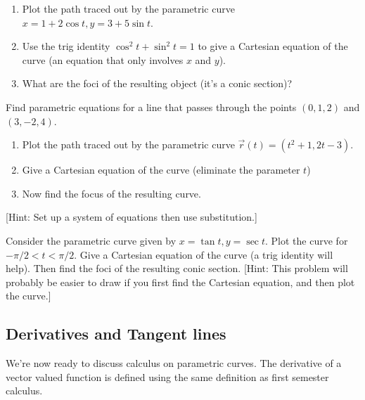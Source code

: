 \begin{problem}
\begin{enumerate}
	\item Plot the path traced out by the parametric curve $x=1+2\cos t, y=3+5\sin t$.  
	\item Use the trig identity $\cos^2t+\sin^2t=1$ to give a Cartesian equation of the curve (an equation that only involves $x$ and $y$). 
	\item What are the foci of the resulting object (it's a conic section)?
\end{enumerate}
\end{problem}

\begin{problem}\label{prob:line equation practice}    
Find parametric equations for a line that passes through the points $(0,1,2)$ and $(3,-2,4)$.
\end{problem}

\begin{problem}
\begin{enumerate}
	\item Plot the path traced out by the parametric curve $\vec r(t)= (t^2+1, 2t-3).$ 
	\item Give a Cartesian equation of the curve (eliminate the parameter $t$)
	\item Now find the focus of the resulting curve.
\end{enumerate}
[Hint: Set up a system of equations then use substitution.]
\end{problem}

\begin{problem}
Consider the parametric curve given by $x=\tan t, y=\sec t$. Plot the curve for $-\pi/2<t<\pi/2$. Give a Cartesian equation of the curve (a trig identity will help).  Then find the foci of the resulting conic section. [Hint: This problem will probably be easier to draw if you first find the Cartesian equation, and then plot the curve.]
\end{problem}

\subsection{Derivatives and Tangent lines}\label{sec:derivatives and tangent lines}
We're now ready to discuss calculus on parametric curves. The derivative of a vector valued function is defined using the same definition as first semester calculus.


